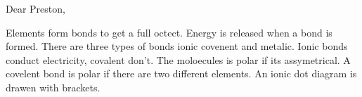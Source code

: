 Dear Preston,

     Elements form bonds to get a full octect.
     Energy is released when a bond is formed.
     There are three types of bonds ionic covenent and metalic.
     Ionic bonds conduct electricity, covalent don't.
     The moloecules is polar if its assymetrical.
     A covelent bond is polar if there are two different elements.
     An ionic dot diagram is drawen with brackets.
